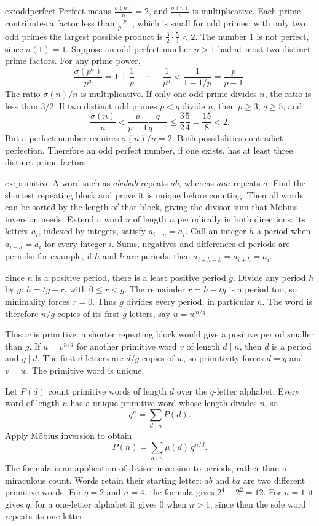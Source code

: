 \begin{solution}{ex:oddperfect}
\idea Perfect means $\frac{\sigma(n)}n=2$, and $\frac{\sigma(n)}n$ is multiplicative. Each prime contributes a factor less than $\frac p{p-1}$, which is small for odd primes; with only two odd primes the largest possible product is $\frac32\cdot\frac54<2$.
\writeup The number $1$ is not perfect, since $\sigma(1)=1$. Suppose an odd perfect number $n>1$ had at most two distinct prime factors. For any prime power,
\[
\frac{\sigma(p^a)}{p^a}
=1+\frac1p+\cdots+\frac1{p^a}
<\frac1{1-1/p}=\frac p{p-1}.
\]
The ratio $\sigma(n)/n$ is multiplicative. If only one odd prime divides $n$, the ratio is less than $3/2$. If two distinct odd primes $p<q$ divide $n$, then $p\ge3$, $q\ge5$, and
\[
\frac{\sigma(n)}n
<\frac p{p-1}\frac q{q-1}
\le\frac32\frac54=\frac{15}{8}<2.
\]
But a perfect number requires $\sigma(n)/n=2$. Both possibilities contradict perfection. Therefore an odd perfect number, if one exists, has at least three distinct prime factors.
\end{solution}

\begin{solution}{ex:primitive}
\idea A word such as $ababab$ repeats $ab$, whereas $aaa$ repeats $a$.
Find the shortest repeating block and prove it is unique before counting.
Then all words can be sorted by the length of that block, giving the
divisor sum that M\"obius inversion needs.
\writeup Extend a word $u$ of length $n$ periodically in both directions:
its letters $a_i$, indexed by integers, satisfy $a_{i+n}=a_i$.
Call an integer $h$ a period when $a_{i+h}=a_i$ for every integer $i$.
Sums, negatives and differences of periods are periods: for example,
if $h$ and $k$ are periods, then
$a_{i+h-k}=a_{i+h}=a_i$.

Since $n$ is a positive period, there is a least positive period $g$.
Divide any period $h$ by $g$: $h=tg+r$, with $0\le r<g$.
The remainder $r=h-tg$ is a period too, so minimality forces $r=0$.
Thus $g$ divides every period, in particular $n$.
The word is therefore $n/g$ copies of its first $g$ letters, say
$u=w^{n/g}$.

This $w$ is primitive: a shorter repeating block would give a positive
period smaller than $g$. If $u=v^{n/d}$ for another primitive word $v$
of length $d\mid n$, then $d$ is a period and $g\mid d$.
The first $d$ letters are $d/g$ copies of $w$, so primitivity forces
$d=g$ and $v=w$. The primitive word is unique.

Let $P(d)$ count primitive words of length $d$ over the $q$-letter alphabet. Every word of length $n$ has a unique primitive word whose length divides $n$, so
\[
q^n=\sum_{d\mid n}P(d).
\]
Apply M\"obius inversion to obtain
\[
P(n)=\sum_{d\mid n}\mu(d)\,q^{n/d}.
\]
The formula is an application of divisor inversion to periods, rather than a miraculous count.
Words retain their starting letter: $ab$ and $ba$ are two different
primitive words. For $q=2$ and $n=4$, the formula gives
$2^4-2^2=12$. For $n=1$ it gives $q$; for a one-letter alphabet it
gives $0$ when $n>1$, since then the sole word repeats its one letter.
\end{solution}

